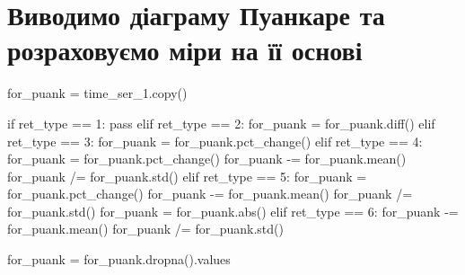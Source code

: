 \documentclass[
  letterpaper,
]{report}
\newenvironment{Shaded}{\begin{snugshade}}{\end{snugshade}}
\newcommand{\BuiltInTok}[1]{\textcolor[rgb]{0.00,0.23,0.31}{#1}}
\newcommand{\ControlFlowTok}[1]{\textcolor[rgb]{0.00,0.23,0.31}{#1}}
\newcommand{\DecValTok}[1]{\textcolor[rgb]{0.68,0.00,0.00}{#1}}
\newcommand{\NormalTok}[1]{\textcolor[rgb]{0.00,0.23,0.31}{#1}}
\newcommand{\OperatorTok}[1]{\textcolor[rgb]{0.37,0.37,0.37}{#1}}
\begin{document}
\hypertarget{ux432ux438ux432ux43eux434ux438ux43cux43e-ux434ux456ux430ux433ux440ux430ux43cux443-ux43fux443ux430ux43dux43aux430ux440ux435-ux442ux430-ux440ux43eux437ux440ux430ux445ux43eux432ux443ux454ux43cux43e-ux43cux456ux440ux438-ux43dux430-ux457ux457-ux43eux441ux43dux43eux432ux456}{%
\section{Виводимо діаграму Пуанкаре та розраховуємо міри на її
основі}\label{ux432ux438ux432ux43eux434ux438ux43cux43e-ux434ux456ux430ux433ux440ux430ux43cux443-ux43fux443ux430ux43dux43aux430ux440ux435-ux442ux430-ux440ux43eux437ux440ux430ux445ux43eux432ux443ux454ux43cux43e-ux43cux456ux440ux438-ux43dux430-ux457ux457-ux43eux441ux43dux43eux432ux456}}

\begin{Shaded}
\begin{Highlighting}[]
\NormalTok{for\_puank }\OperatorTok{=}\NormalTok{ time\_ser\_1.copy()}

\ControlFlowTok{if}\NormalTok{ ret\_type }\OperatorTok{==} \DecValTok{1}\NormalTok{:}
    \ControlFlowTok{pass}
\ControlFlowTok{elif}\NormalTok{ ret\_type }\OperatorTok{==} \DecValTok{2}\NormalTok{:}
\NormalTok{    for\_puank }\OperatorTok{=}\NormalTok{ for\_puank.diff()}
\ControlFlowTok{elif}\NormalTok{ ret\_type }\OperatorTok{==} \DecValTok{3}\NormalTok{:}
\NormalTok{    for\_puank }\OperatorTok{=}\NormalTok{ for\_puank.pct\_change()}
\ControlFlowTok{elif}\NormalTok{ ret\_type }\OperatorTok{==} \DecValTok{4}\NormalTok{:}
\NormalTok{    for\_puank }\OperatorTok{=}\NormalTok{ for\_puank.pct\_change()}
\NormalTok{    for\_puank }\OperatorTok{{-}=}\NormalTok{ for\_puank.mean()}
\NormalTok{    for\_puank }\OperatorTok{/=}\NormalTok{ for\_puank.std()}
\ControlFlowTok{elif}\NormalTok{ ret\_type }\OperatorTok{==} \DecValTok{5}\NormalTok{: }
\NormalTok{    for\_puank }\OperatorTok{=}\NormalTok{ for\_puank.pct\_change()}
\NormalTok{    for\_puank }\OperatorTok{{-}=}\NormalTok{ for\_puank.mean()}
\NormalTok{    for\_puank }\OperatorTok{/=}\NormalTok{ for\_puank.std()}
\NormalTok{    for\_puank }\OperatorTok{=}\NormalTok{ for\_puank.}\BuiltInTok{abs}\NormalTok{()}
\ControlFlowTok{elif}\NormalTok{ ret\_type }\OperatorTok{==} \DecValTok{6}\NormalTok{:}
\NormalTok{    for\_puank }\OperatorTok{{-}=}\NormalTok{ for\_puank.mean()}
\NormalTok{    for\_puank }\OperatorTok{/=}\NormalTok{ for\_puank.std()}

\NormalTok{for\_puank }\OperatorTok{=}\NormalTok{ for\_puank.dropna().values}
\end{Highlighting}
\end{Shaded}
\end{document}
